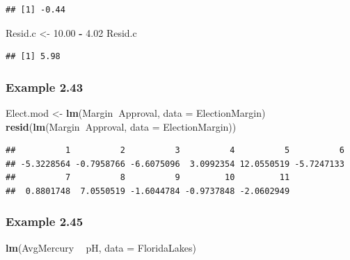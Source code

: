 \documentclass[]{book}
\newenvironment{Shaded}{\begin{snugshade}}{\end{snugshade}}
\newcommand{\DataTypeTok}[1]{\textcolor[rgb]{0.13,0.29,0.53}{#1}}
\newcommand{\FloatTok}[1]{\textcolor[rgb]{0.00,0.00,0.81}{#1}}
\newcommand{\KeywordTok}[1]{\textcolor[rgb]{0.13,0.29,0.53}{\textbf{#1}}}
\newcommand{\NormalTok}[1]{#1}
\newcommand{\OperatorTok}[1]{\textcolor[rgb]{0.81,0.36,0.00}{\textbf{#1}}}
\newcommand{\StringTok}[1]{\textcolor[rgb]{0.31,0.60,0.02}{#1}}
\begin{document}
\begin{verbatim}
## [1] -0.44
\end{verbatim}

\begin{Shaded}
\begin{Highlighting}[]
\NormalTok{Resid.c <-}\StringTok{ }\FloatTok{10.00} \OperatorTok{-}\StringTok{ }\FloatTok{4.02}
\NormalTok{Resid.c}
\end{Highlighting}
\end{Shaded}

\begin{verbatim}
## [1] 5.98
\end{verbatim}

\hypertarget{example-2.43}{%
\subsubsection{Example 2.43}\label{example-2.43}}

\begin{Shaded}
\begin{Highlighting}[]
\NormalTok{Elect.mod <-}\StringTok{ }\KeywordTok{lm}\NormalTok{(Margin}\OperatorTok{~}\NormalTok{Approval, }\DataTypeTok{data =}\NormalTok{ ElectionMargin)}
\KeywordTok{resid}\NormalTok{(}\KeywordTok{lm}\NormalTok{(Margin}\OperatorTok{~}\NormalTok{Approval, }\DataTypeTok{data =}\NormalTok{ ElectionMargin))}
\end{Highlighting}
\end{Shaded}

\begin{verbatim}
##          1          2          3          4          5          6 
## -5.3228564 -0.7958766 -6.6075096  3.0992354 12.0550519 -5.7247133 
##          7          8          9         10         11 
##  0.8801748  7.0550519 -1.6044784 -0.9737848 -2.0602949
\end{verbatim}

\hypertarget{example-2.45}{%
\subsubsection{Example 2.45}\label{example-2.45}}

\begin{Shaded}
\begin{Highlighting}[]
\KeywordTok{lm}\NormalTok{(AvgMercury }\OperatorTok{~}\StringTok{ }\NormalTok{pH, }\DataTypeTok{data =}\NormalTok{ FloridaLakes)}
\end{Highlighting}
\end{Shaded}
\end{document}
